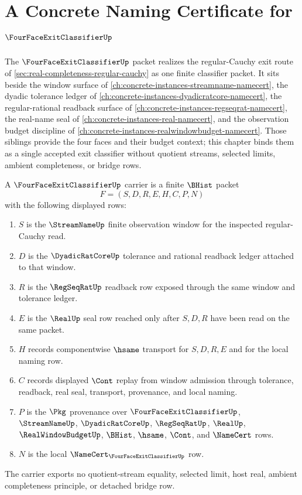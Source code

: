 \chapter{A Concrete Naming Certificate for $\FourFaceExitClassifierUp$}
\label{ch:concrete-instances-four-face-exit-classifier-namecert}

The $\FourFaceExitClassifierUp$ packet realizes the regular-Cauchy exit route of \autoref{sec:real-completeness-regular-cauchy} as one finite classifier packet. It sits beside the window surface of \autoref{ch:concrete-instances-streamname-namecert}, the dyadic tolerance ledger of \autoref{ch:concrete-instances-dyadicratcore-namecert}, the regular-rational readback surface of \autoref{ch:concrete-instances-regseqrat-namecert}, the real-name seal of \autoref{ch:concrete-instances-real-namecert}, and the observation budget discipline of \autoref{ch:concrete-instances-realwindowbudget-namecert}. Those siblings provide the four faces and their budget context; this chapter binds them as a single accepted exit classifier without quotient streams, selected limits, ambient completeness, or bridge rows.

\begin{definition}
\label{def:four-face-exit-classifier-carrier}
A $\FourFaceExitClassifierUp$ carrier is a finite $\BHist$ packet
$$
F=(S,D,R,E,H,C,P,N)
$$
with the following displayed rows:
\begin{enumerate}
\item $S$ is the $\StreamNameUp$ finite observation window for the inspected regular-Cauchy read.
\item $D$ is the $\DyadicRatCoreUp$ tolerance and rational readback ledger attached to that window.
\item $R$ is the $\RegSeqRatUp$ readback row exposed through the same window and tolerance ledger.
\item $E$ is the $\RealUp$ seal row reached only after $S,D,R$ have been read on the same packet.
\item $H$ records componentwise $\hsame$ transport for $S,D,R,E$ and for the local naming row.
\item $C$ records displayed $\Cont$ replay from window admission through tolerance, readback, real seal, transport, provenance, and local naming.
\item $P$ is the $\Pkg$ provenance over $\FourFaceExitClassifierUp$, $\StreamNameUp$, $\DyadicRatCoreUp$, $\RegSeqRatUp$, $\RealUp$, $\RealWindowBudgetUp$, $\BHist$, $\hsame$, $\Cont$, and $\NameCert$ rows.
\item $N$ is the local $\NameCert_{\FourFaceExitClassifierUp}$ row.
\end{enumerate}
The carrier exports no quotient-stream equality, selected limit, host real, ambient completeness principle, or detached bridge row.
\end{definition}

